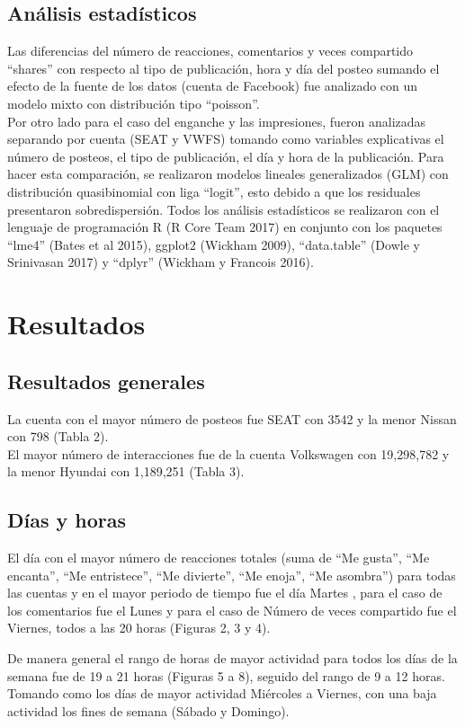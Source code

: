 \documentclass[a4paper,10pt]{article}
\begin{document}
\subsection{Análisis estadísticos}
Las diferencias del número de reacciones, comentarios y veces compartido ``shares'' 
con respecto al tipo de publicación, hora y día del posteo sumando el efecto de
la fuente de los datos (cuenta de Facebook) fue analizado con un modelo mixto 
con distribución tipo ``poisson''.\\
Por otro lado para el caso del enganche y las impresiones, fueron 
analizadas separando por cuenta (SEAT y VWFS) tomando como variables
explicativas el número de posteos, el tipo de publicación, el día y hora de 
la publicación. Para hacer esta comparación, se realizaron modelos lineales generalizados (GLM)
con distribución quasibinomial con liga ``logit'', esto debido a que los residuales 
presentaron sobredispersión.
Todos los análisis estadísticos se realizaron con el lenguaje de programación
R (R Core Team 2017) en conjunto con los paquetes ``lme4'' (Bates et al 2015), 
ggplot2 (Wickham 2009), ``data.table'' (Dowle y Srinivasan 2017) y 
``dplyr'' (Wickham y Francois 2016). 



\section{Resultados}
\subsection{Resultados generales}
La cuenta con el mayor número de posteos fue SEAT con 3542 y la menor Nissan con 798 (Tabla 2).\\
El mayor número de interacciones fue de la cuenta Volkswagen con 19,298,782 y la 
menor Hyundai con  1,189,251 (Tabla 3).


\subsection{Días y horas}
El día con el mayor número de reacciones totales (suma de ``Me gusta'', 
``Me encanta'', ``Me entristece'', ``Me divierte'', ``Me enoja'', ``Me asombra'')
para todas las cuentas y en el mayor periodo de tiempo fue el día Martes ,
para el caso de los comentarios fue el Lunes y para el caso
de Número de veces compartido fue el Viernes, todos a las 20 horas (Figuras 2, 3 y 4).

De manera general el rango de horas de mayor actividad para todos los días
de la semana fue de 19 a 21 horas (Figuras 5 a 8), seguido del rango de 9 
a 12 horas. Tomando como los días de mayor actividad Miércoles a Viernes, 
con una baja actividad los fines de semana (Sábado y Domingo). 
\end{document}
